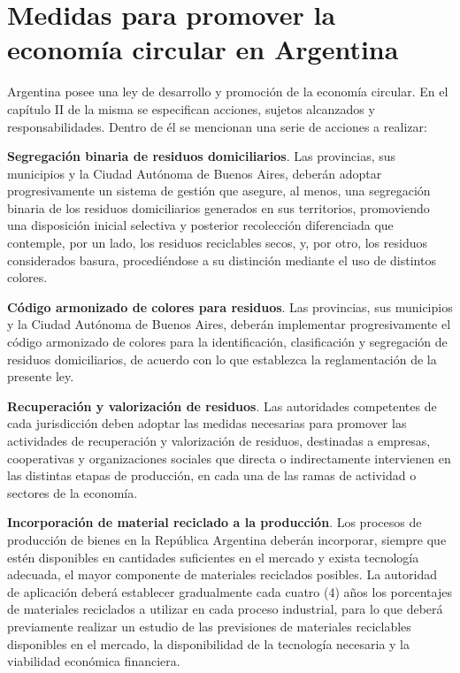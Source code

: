 \documentclass[runningheads]{llncs}
\begin{document}
\section{Medidas para promover la economía circular en Argentina}

\hspace{0.5cm} Argentina posee una ley de  desarrollo y promoción de la economía circular. En el capítulo II de la misma se especifican acciones, sujetos alcanzados y responsabilidades. Dentro de él se mencionan una serie de acciones a realizar:

\textbf{Segregación binaria de residuos domiciliarios}. Las provincias, sus municipios y la Ciudad Autónoma de Buenos Aires, deberán adoptar progresivamente un sistema de gestión que asegure, al menos, una segregación binaria de los residuos domiciliarios generados en sus territorios, promoviendo una disposición inicial selectiva y posterior recolección diferenciada que contemple, por un lado, los residuos reciclables secos, y, por otro, los residuos considerados basura, procediéndose a su distinción mediante el uso de distintos colores.
 
\textbf{Código armonizado de colores para residuos}. Las provincias, sus municipios y la Ciudad Autónoma de Buenos Aires, deberán implementar progresivamente el código armonizado de colores para la identificación, clasificación y segregación de residuos domiciliarios, de acuerdo con lo que establezca la reglamentación de la presente ley.

\textbf{Recuperación y valorización de residuos}. Las autoridades competentes de cada jurisdicción deben adoptar las medidas necesarias para promover las actividades de recuperación y valorización de residuos, destinadas a empresas, cooperativas y organizaciones sociales que directa o indirectamente intervienen en las distintas etapas de producción, en cada una de las ramas de actividad o sectores de la economía.

\textbf{Incorporación de material reciclado a la producción}. Los procesos de producción de bienes en la República Argentina deberán incorporar, siempre que estén disponibles en cantidades suficientes en el mercado y exista tecnología adecuada, el mayor componente de materiales reciclados posibles. La autoridad de aplicación deberá establecer gradualmente cada cuatro (4) años los porcentajes de materiales reciclados a utilizar en cada proceso industrial, para lo que deberá previamente realizar un estudio de las previsiones de materiales reciclables disponibles en el mercado, la disponibilidad de la tecnología necesaria y la viabilidad económica financiera.
\end{document}
